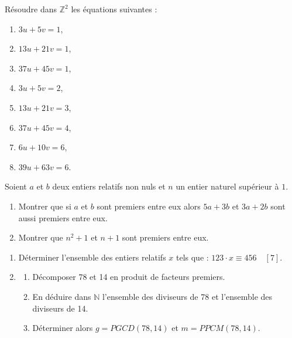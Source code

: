 \begin{exo}
      R\'esoudre dans $\mathbb{Z}^2$ les \'equations suivantes : 
      \begin{enumerate}
            \item $3 u + 5 v = 1$,
            \item $13 u + 21 v = 1$,
            \item $37 u + 45 v = 1$,
            \item $3 u + 5 v = 2$,
            \item $13 u + 21 v = 3$,
            \item $37 u + 45 v = 4$,
            \item $6 u + 10 v = 6$,
            \item $39 u + 63 v = 6$.
      \end{enumerate}
\end{exo}
%
\begin{exo}
      Soient $a$ et $b$ deux entiers relatifs non nuls et $n$ un entier naturel sup\'erieur \`a $1$.
      \begin{enumerate}
            \item Montrer que si $a$ et $b$ sont premiers entre eux alors $5a + 3b$ et $3a + 2b$ sont aussi premiers entre eux.
            \item Montrer que $n^2 + 1$ et $n+1$ sont premiers entre eux.
      \end{enumerate}
\end{exo}
\begin{exo}%
\begin{enumerate}
\item D\'eterminer l'ensemble des entiers relatifs $x$ tels que : $123 \cdot x \equiv 456 \quad [7]$.
\item \begin{enumerate}
      \item D\'ecomposer 78 et 14 en produit de facteurs premiers.
      \item En d\'eduire dans $\mathbb{N}$ l'ensemble des diviseurs de 78 et l'ensemble des diviseurs de 14.
      \item D\'eterminer alors $g = PGCD (78 , 14)$ et $m = PPCM (78 , 14)$.
      \end{enumerate}
\end{enumerate}
\end{exo}
